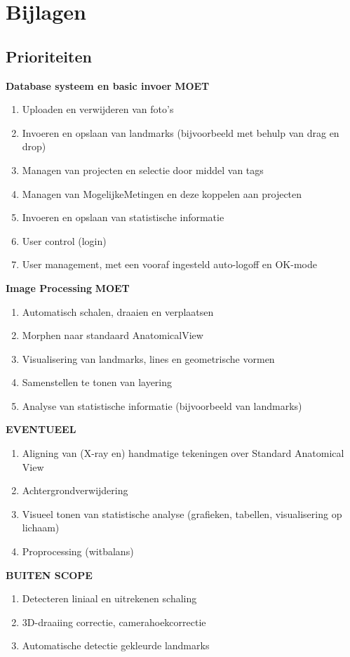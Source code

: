 \section{Bijlagen}
\label{Bijlagen}
\subsection{Prioriteiten}

\Large{\textbf{Database systeem en basic invoer}}
\large{\textbf{MOET}}
\begin{enumerate}
	\item Uploaden en verwijderen van foto's
	\item Invoeren en opslaan van landmarks (bijvoorbeeld met behulp van drag en drop)
	\item Managen van projecten en selectie door middel van tags
	\item Managen van MogelijkeMetingen en deze koppelen aan projecten
	\item Invoeren en opslaan van statistische informatie
	\item User control (login)
	\item User management, met een vooraf ingesteld auto-logoff en OK-mode
\end{enumerate}

\Large{\textbf{Image Processing}}
\large{\textbf{MOET}}
\begin{enumerate}
	\item Automatisch schalen, draaien en verplaatsen
	\item Morphen naar standaard AnatomicalView
	\item Visualisering van landmarks, lines en geometrische vormen
	\item Samenstellen te tonen van layering
	\item Analyse van statistische informatie (bijvoorbeeld van landmarks)
\end{enumerate}
\large{\textbf{EVENTUEEL}}
\begin{enumerate}
	\item Aligning van (X-ray en) handmatige tekeningen over Standard Anatomical View
	\item Achtergrondverwijdering
	\item Visueel tonen van statistische analyse (grafieken, tabellen, visualisering op lichaam)
	\item Proprocessing (witbalans)
\end{enumerate}
\large{\textbf{BUITEN SCOPE}}
\begin{enumerate}
	\item Detecteren liniaal en uitrekenen schaling
	\item 3D-draaiing correctie, camerahoekcorrectie
	\item Automatische detectie gekleurde landmarks
\end{enumerate}

